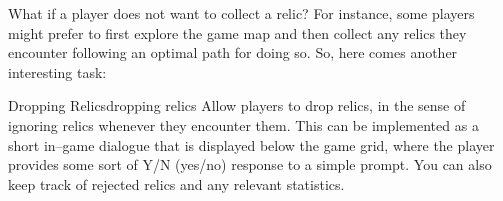 \documentclass[a4paper, 11pt]{article}
\numberwithin{equation}{section}
\theoremstyle{definition}
\begin{document}
	What if a player does not want to collect a relic? For instance, some players might prefer to first explore the game map and then collect any relics they encounter following an optimal path for doing so. So, here comes another interesting task:
	
	\begin{task}{Dropping Relics}{dropping relics}
		Allow players to drop relics, in the sense of ignoring relics whenever they encounter them. This can be implemented as a short in--game dialogue that is displayed below the game grid, where the player provides some sort of Y/N (yes/no) response to a simple prompt. You can also keep track of rejected relics and any relevant statistics.
	\end{task}
\end{document}
